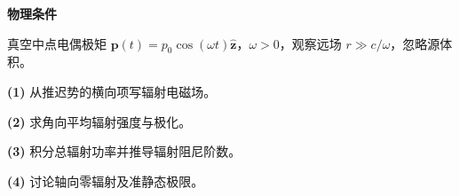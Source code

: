 \textbf{物理条件}\par 真空中点电偶极矩 \(\boldsymbol p(t)=p_0\cos(\omega t)\hat{\boldsymbol z}\)，\(\omega>0\)，观察远场 \(r\gg c/\omega\)，忽略源体积。
\par\noindent\textbf{(1)} 从推迟势的横向项写辐射电磁场。
\par\noindent\textbf{(2)} 求角向平均辐射强度与极化。
\par\noindent\textbf{(3)} 积分总辐射功率并推导辐射阻尼阶数。
\par\noindent\textbf{(4)} 讨论轴向零辐射及准静态极限。
